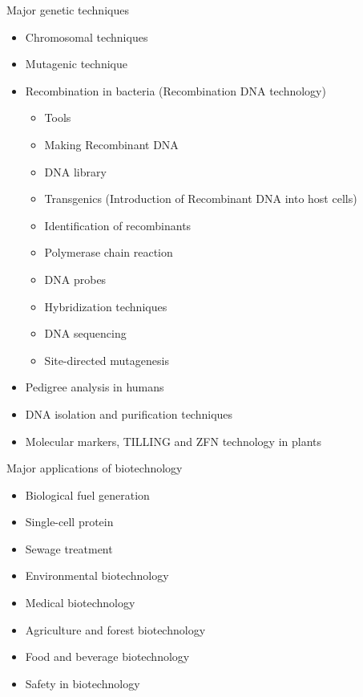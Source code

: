 \documentclass[ignorenonframetext,aspectratio=169]{beamer}
\providecommand{\tightlist}{%
  \setlength{\itemsep}{0pt}\setlength{\parskip}{0pt}}
\begin{document}
\begin{frame}{Major genetic techniques}
\protect\hypertarget{major-genetic-techniques}{}

\begin{itemize}
\tightlist
\item
  Chromosomal techniques
\item
  Mutagenic technique
\item
  Recombination in bacteria (Recombination DNA technology)

  \begin{itemize}
  \tightlist
  \item
    Tools
  \item
    Making Recombinant DNA
  \item
    DNA library
  \item
    Transgenics (Introduction of Recombinant DNA into host cells)
  \item
    Identification of recombinants
  \item
    Polymerase chain reaction
  \item
    DNA probes
  \item
    Hybridization techniques
  \item
    DNA sequencing
  \item
    Site-directed mutagenesis
  \end{itemize}
\item
  Pedigree analysis in humans
\item
  DNA isolation and purification techniques
\item
  Molecular markers, TILLING and ZFN technology in plants
\end{itemize}

\end{frame}

\begin{frame}{Major applications of biotechnology}
\protect\hypertarget{major-applications-of-biotechnology}{}

\begin{itemize}
\tightlist
\item
  Biological fuel generation
\item
  Single-cell protein
\item
  Sewage treatment
\item
  Environmental biotechnology
\item
  Medical biotechnology
\item
  Agriculture and forest biotechnology
\item
  Food and beverage biotechnology
\item
  Safety in biotechnology
\end{itemize}

\end{frame}
\end{document}
